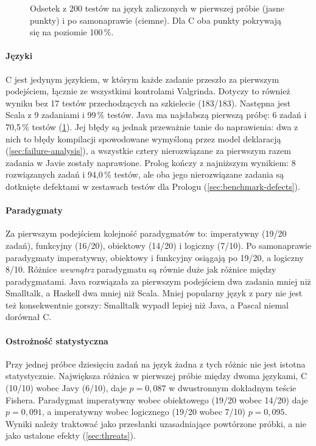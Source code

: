 \begin{figure}[htbp]
  \centering
  
  \caption{Odsetek z 200 testów na język zaliczonych w pierwszej próbie (jasne punkty) i po
    samonaprawie (ciemne). Dla C oba punkty pokrywają się na poziomie 100\,\%.}
  \label{fig:passrate}
\end{figure}

\paragraph{Języki} C jest jedynym językiem, w którym każde zadanie przeszło za pierwszym podejściem,
łącznie ze wszystkimi kontrolami Valgrinda. Dotyczy to również wyniku bez 17 testów przechodzących
na szkielecie (183/183). Następna jest Scala z 9 zadaniami i 99\,\% testów. Java ma najsłabszą
pierwszą próbę: 6 zadań i 70,5\,\% testów (\cref{fig:passrate}). Jej błędy są jednak przeważnie
tanie do naprawienia: dwa z nich to błędy kompilacji spowodowane wymyśloną przez model deklaracją
 (\cref{sec:failure-analysis}), a wszystkie cztery nierozwiązane za pierwszym razem
zadania w Javie zostały naprawione. Prolog kończy z najniższym wynikiem: 8 rozwiązanych zadań
i 94,0\,\% testów, ale oba jego nierozwiązane zadania są dotknięte defektami w zestawach testów dla
Prologu (\cref{sec:benchmark-defects}).

\paragraph{Paradygmaty} Za pierwszym podejściem kolejność paradygmatów to: imperatywny (19/20 zadań),
funkcyjny (16/20), obiektowy (14/20) i logiczny (7/10). Po samonaprawie paradygmaty imperatywny,
obiektowy i funkcyjny osiągają po 19/20, a logiczny 8/10. Różnice \emph{wewnątrz} paradygmatu są
równie duże jak różnice między paradygmatami. Java rozwiązała za pierwszym podejściem dwa zadania
mniej niż Smalltalk, a Haskell dwa mniej niż Scala. Mniej popularny język z pary nie jest też
konsekwentnie gorszy: Smalltalk wypadł lepiej niż Java, a Pascal niemal dorównał C.

\paragraph{Ostrożność statystyczna} Przy jednej próbce dziesięciu zadań na język żadna z tych różnic
nie jest istotna statystycznie. Największa różnica w pierwszej próbie między dwoma językami, C
(10/10) wobec Javy (6/10), daje $p = 0,087$ w dwustronnym dokładnym teście Fishera. Paradygmat
imperatywny wobec obiektowego (19/20 wobec 14/20) daje $p = 0,091$, a imperatywny wobec logicznego
(19/20 wobec 7/10) $p = 0,095$. Wyniki należy traktować jako przesłanki uzasadniające powtórzone
próbki, a nie jako ustalone efekty (\cref{sec:threats}).

